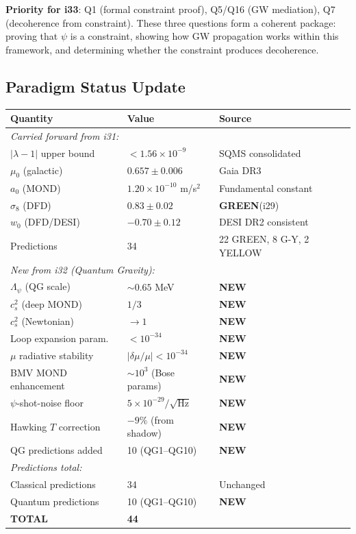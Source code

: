 \documentclass[11pt,a4paper]{article}
\newcommand{\GREEN}{\textcolor{dfdgreen}{\textbf{GREEN}}}
\newcommand{\NEW}{\textcolor{dfdblue}{\textbf{NEW}}}
\begin{document}
\textbf{Priority for i33}: Q1 (formal constraint proof), Q5/Q16 (GW mediation), Q7 (decoherence from constraint). These three questions form a coherent package: proving that $\psi$ is a constraint, showing how GW propagation works within this framework, and determining whether the constraint produces decoherence.

\subsection{Paradigm Status Update}
\label{sec:paradigm-status}

\begin{center}
\begin{longtable}{p{4cm}p{3cm}p{5cm}}
\toprule
\textbf{Quantity} & \textbf{Value} & \textbf{Source} \\
\midrule
\endfirsthead
\multicolumn{3}{l}{\textit{Carried forward from i31:}} \\
$|{\lambda-1}|$ upper bound & $< 1.56\times 10^{-9}$ & SQMS consolidated \\
$\mu_0$ (galactic) & $0.657 \pm 0.006$ & Gaia DR3 \\
$a_0$ (MOND) & $1.20\times 10^{-10}$ m/s$^2$ & Fundamental constant \\
$\sigma_8$ (DFD) & $0.83 \pm 0.02$ & \GREEN (i29) \\
$w_0$ (DFD/DESI) & $-0.70 \pm 0.12$ & DESI DR2 consistent \\
Predictions & 34 & 22 GREEN, 8 G-Y, 2 YELLOW \\
\midrule
\multicolumn{3}{l}{\textit{New from i32 (Quantum Gravity):}} \\
$\Lambda_\psi$ (QG scale) & $\sim 0.65$ MeV & \NEW \\
$c_s^2$ (deep MOND) & $1/3$ & \NEW \\
$c_s^2$ (Newtonian) & $\to 1$ & \NEW \\
Loop expansion param. & $< 10^{-34}$ & \NEW \\
$\mu$ radiative stability & $|\delta\mu/\mu| < 10^{-34}$ & \NEW \\
BMV MOND enhancement & $\sim 10^3$ (Bose params) & \NEW \\
$\psi$-shot-noise floor & $5\times 10^{-29}/\sqrt{\text{Hz}}$ & \NEW \\
Hawking $T$ correction & $-9\%$ (from shadow) & \NEW \\
QG predictions added & 10 (QG1--QG10) & \NEW \\
\midrule
\multicolumn{3}{l}{\textit{Predictions total:}} \\
Classical predictions & 34 & Unchanged \\
Quantum predictions & 10 (QG1--QG10) & \NEW \\
\textbf{TOTAL} & \textbf{44} & \\
\bottomrule
\end{longtable}
\end{center}
\end{document}
